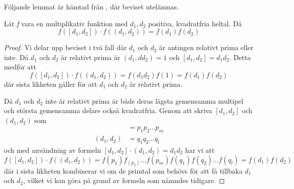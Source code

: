 Följande lemmat är hämtad från \cite[Lemma 7.2.2]{cojocarumurty}, där beviset utelämnas.
\begin{lemma}\label{APDX:multFunk}
Låt \textit{f} vara en multiplikativ funktion med \(d_1,d_2\) positiva, kvadratfria heltal. Då
\begin{equation}
    f([d_1,d_2])\cdot f((d_1, d_2)) = f(d_1)f(d_2)\nonumber
\end{equation}
\end{lemma}
\begin{proof}
Vi delar upp beviset i två fall där \(d_1\) och \(d_2\) är antingen relativt prima eller inte. Då \(d_1\) och \(d_2\) är relativt prima är \((d_1,dd_2) = 1\) och \([d_1,d_2] = d_1d_2\). Detta medför att
\begin{equation}
    f([d_1,d_2])\cdot f((d_1, d_2)) = f(d_1d_2)f(1) = f(d_1)f(d_2)\nonumber
\end{equation}
där sista likheten gäller för att  \(d_1\) och \(d_2\) är relativt prima. 

Då  \(d_1\) och \(d_2\) inte är relativt prima är både deras lägsta gemensamma multipel och största gemensamma delare också kvadratfria. Genom att skriva \([d_1,d_2]\) och \((d_1,d_2)\) som
\begin{align}
    [d_1,d_2] &= p_1p_2...p_m\nonumber\\
    (d_1,d_2) &= q_1q_2...q_l\nonumber
\end{align}
och med användning av formeln \([d_1,d_2]\cdot(d_1,d_2) = d_1d_2\) har vi att
\begin{equation}
    f([d_1,d_2])\cdot f((d_1, d_2)) = f(p_1)f_(p_2)...f(p_m)f(q_1)f(q_2)...f(q_l) = f(d_1)f(d_2)\nonumber
\end{equation}
där i sista likheten kombinerar vi om de primtal som behövs för att få tillbaka \(d_1\) och \(d_2\), vilket vi kan göra på grund av formeln som nämndes tidigare.
\end{proof}